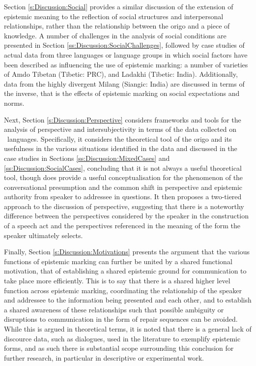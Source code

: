 Section \ref{s:Discussion:Social} provides a similar discussion of the extension of epistemic meaning to the reflection of social structures and interpersonal relationships, rather than the relationship between the origo and a piece of knowledge. A number of challenges in the analysis of social conditions are presented in Section \ref{ss:Discussion:SocialChallenges}, followed by case studies of actual data from three languages or language groups in which social factors have been described as influencing the use of epistemic marking: a number of varieties of Amdo Tibetan (Tibetic: PRC), and Ladakhi (Tibetic: India). Additionally, data from the highly divergent Milang (Siangic: India) are discussed in terms of the inverse, that is the effects of epistemic marking on social expectations and norms.

Next, Section \ref{s:Discussion:Perspective} considers frameworks and tools for the analysis of perspective and intersubjectivity in terms of the data collected on \lfam\ languages. Specifically, it considers the theoretical tool of the origo and its usefulness in the various situations identified in the data and discussed in the case studies in Sections \ref{ss:Discussion:MixedCases} and \ref{ss:Discussion:SocialCases}, concluding that it is not always a useful theoretical tool, though does provide a useful conceptualisation for the phenomenon of the conversational presumption and the common shift in perspective and epistemic authority from speaker to addressee in questions. It then proposes a two-tiered approach to the discussion of perspective, suggesting that there is a noteworthy difference between the perspectives considered by the speaker in the construction of a speech act and the perspectives referenced in the meaning of the form the speaker ultimately selects.

Finally, Section \ref{s:Discussion:Motivations} presents the argument that the various functions of epistemic marking can further be united by a shared functional motivation, that of establishing a shared epistemic ground for communication to take place more efficiently. This is to say that there is a shared higher level function across epistemic marking, coordinating the relationship of the speaker and addressee to the information being presented and each other, and to establish a shared awareness of these relationships such that possible ambiguity or disruptions to communication in the form of repair sequences can be avoided. While this is argued in theoretical terms, it is noted that there is a general lack of discource data, such as dialogues, used in the literature to exemplify epistemic forms, and as such there is substantial scope surrounding this conclusion for further research, in particular in descriptive or experimental work.

